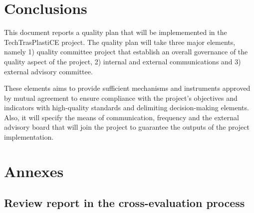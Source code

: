 \documentclass[
  12pt,
  oneside]{book}
\begin{document}
\chapter{Conclusions}\label{conclusions}

This document reports a quality plan that will be implememented in the
TechTrasPlastiCE project. The quality plan will take three major
elements, namely 1) quality committee project that establish an overall
governance of the quality aspect of the project, 2) internal and
external communications and 3) external advisory committee.

These elements aims to provide sufficient mechanisms and instruments
approved by mutual agreement to ensure compliance with the project's
objectives and indicators with high-quality standards and delimiting
decision-making elements. Also, it will specify the means of
communication, frequency and the external advisory board that will join
the project to guarantee the outputs of the project implementation.

\appendix

\chapter{Annexes}\label{annexes}

\section{Review report in the cross-evaluation process}\label{sec-cross}
\end{document}
